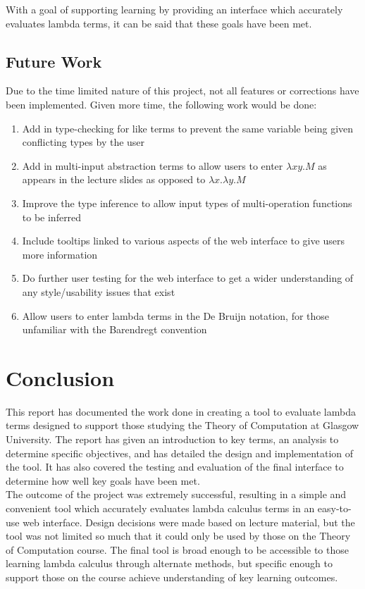 \documentclass[a4paper,11pt]{report}
\begin{document}
With a goal of supporting learning by providing an interface which accurately evaluates lambda terms, it can be said that these goals have been met.

\section{Future Work}
Due to the time limited nature of this project, not all features or corrections have been implemented. Given more time, the following work would be done:

\begin{enumerate}
	\item Add in type-checking for like terms to prevent the same variable being given conflicting types by the user
	\item Add in multi-input abstraction terms to allow users to enter $\lambda xy.M$ as appears in the lecture slides \cite{Gay2019} as opposed to $\lambda x.\lambda y.M$
	\item Improve the type inference to allow input types of multi-operation functions to be inferred
	\item Include tooltips linked to various aspects of the web interface to give users more information
	\item Do further user testing for the web interface to get a wider understanding of any style/usability issues that exist 
	\item Allow users to enter lambda terms in the De Bruijn notation, for those unfamiliar with the Barendregt convention
\end{enumerate}

\chapter{Conclusion}
This report has documented the work done in creating a tool to evaluate lambda terms designed to support those studying the Theory of Computation at Glasgow University. The report has given an introduction to key terms, an analysis to determine specific objectives, and has detailed the design and implementation of the tool. It has also covered the testing and evaluation of the final interface to determine how well key goals have been met.\\

The outcome of the project was extremely successful, resulting in a simple and convenient tool which accurately evaluates lambda calculus terms in an easy-to-use web interface. Design decisions were made based on lecture material, but the tool was not limited so much that it could only be used by those on the Theory of Computation course. The final tool is broad enough to be accessible to those learning lambda calculus through alternate methods, but specific enough to support those on the course achieve understanding of key learning outcomes.\\
\end{document}
